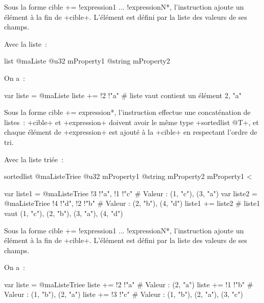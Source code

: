 Sous la forme \ggsq*cible += !expression1 ... !expressionN*, l'instruction ajoute un élément à la fin de \ggsq+cible+. L'élément est défini par la liste des valeurs de ses champs.

Avec la liste~:
\begin{galgas4}
list @maListe {
  @u32 mProperty1
  @string mProperty2
}
\end{galgas4}

On a~:

\begin{galgas4}
var liste = @maListe {}
liste += !2 !"a" # liste vaut contient un élément 2, "a"
\end{galgas4}







Sous la forme \ggsq*cible += expression*, l'instruction effectue une concaténation de listes~: \ggsq+cible+ et \ggsq+expression+ doivent avoir le même type \ggsq+sortedlist @T+, et chaque élément de \ggsq+expression+ est ajouté à la \ggsq+cible+ en respectant l'ordre de tri.

Avec la liste triée~:
\begin{galgas4}
sortedlist @maListeTriee {
  @u32 mProperty1
  @string mProperty2
}{
  mProperty1 <
}
\end{galgas4}

\begin{galgas4}
var liste1 = @maListeTriee {!3 !"a", !1 !"c"} # Valeur : (1, "c"), (3, "a")
var liste2 = @maListeTriee {!4 !"d", !2 !"b"} # Valeur : (2, "b"), (4, "d")
liste1 += liste2 # liste1 vaut (1, "c"), (2, "b"), (3, "a"), (4, "d")
\end{galgas4}



Sous la forme \ggsq*cible += !expression1 ... !expressionN*, l'instruction ajoute un élément à la fin de \ggsq+cible+. L'élément est défini par la liste des valeurs de ses champs.


On a~:

\begin{galgas4}
var liste = @maListeTriee {}
liste += !2 !"a" # Valeur : (2, "a")
liste += !1 !"b" # Valeur : (1, "b"), (2, "a")
liste += !3 !"c" # Valeur : (1, "b"), (2, "a"), (3, "c")
\end{galgas4}







